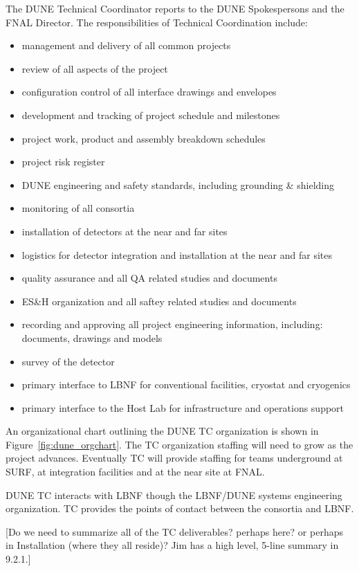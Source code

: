 The DUNE Technical Coordinator reports to the DUNE Spokespersons and the
FNAL Director. The responsibilities of Technical Coordination include:
\begin{itemize}
  \item management and delivery of all common projects
  \item review of all aspects of the project
  \item configuration control of all interface drawings and envelopes
  \item development and tracking of project schedule and milestones
  \item project work, product and assembly breakdown schedules
  \item project risk register
  \item DUNE engineering and safety standards, including grounding \& shielding
  \item monitoring of all consortia
  \item installation of detectors at the near and far sites
  \item logistics for detector integration and installation at the near and far sites
  \item quality assurance and all QA related studies and documents
  \item ES\&H organization and all saftey related studies and documents
  \item recording and approving all project engineering information, including: documents, drawings and models
  \item survey of the detector
  \item primary interface to LBNF for conventional facilities, cryostat and cryogenics
  \item primary interface to the Host Lab for infrastructure and operations support
\end {itemize}

An organizational chart outlining the DUNE TC organization is shown in
Figure~\ref{fig:dune_orgchart}. The TC organization staffing will need
to grow as the project advances. Eventually TC will provide staffing
for teams underground at SURF, at integration facilities and at the
near site at FNAL.

DUNE TC interacts with LBNF though the LBNF/DUNE systems engineering
organization. TC provides the points of contact between the consortia
and LBNF.

[Do we need to summarize all of the TC deliverables? perhaps here? or
  perhaps in Installation (where they all reside)? Jim has a high
  level, 5-line summary in 9.2.1.]





